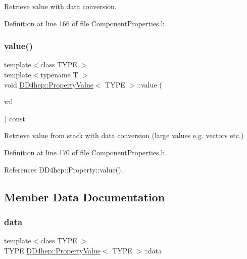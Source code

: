 Retrieve value with data conversion. 



Definition at line 166 of file Component\+Properties.\+h.

\hypertarget{class_d_d4hep_1_1_property_value_aa2525eeea938924a45de58e02d25c094}{}\label{class_d_d4hep_1_1_property_value_aa2525eeea938924a45de58e02d25c094} 
\subsubsection{\texorpdfstring{value()}{value()}\hspace{0.1cm}{\footnotesize\ttfamily [2/2]}}
{\footnotesize\ttfamily template$<$class T\+Y\+PE $>$ \\
template$<$typename T $>$ \\
void \hyperlink{class_d_d4hep_1_1_property_value}{D\+D4hep\+::\+Property\+Value}$<$ T\+Y\+PE $>$\+::value (\begin{DoxyParamCaption}\item[{T\+Y\+PE \&}]{val }\end{DoxyParamCaption}) const\hspace{0.3cm}{\ttfamily [inline]}}



Retrieve value from stack with data conversion (large values e.\+g. vectors etc.) 



Definition at line 170 of file Component\+Properties.\+h.



References D\+D4hep\+::\+Property\+::value().



\subsection{Member Data Documentation}
\hypertarget{class_d_d4hep_1_1_property_value_ad38a9abb3265886b815fa435ca481e24}{}\label{class_d_d4hep_1_1_property_value_ad38a9abb3265886b815fa435ca481e24} 
\subsubsection{\texorpdfstring{data}{data}}
{\footnotesize\ttfamily template$<$class T\+Y\+PE $>$ \\
T\+Y\+PE \hyperlink{class_d_d4hep_1_1_property_value}{D\+D4hep\+::\+Property\+Value}$<$ T\+Y\+PE $>$\+::data}



